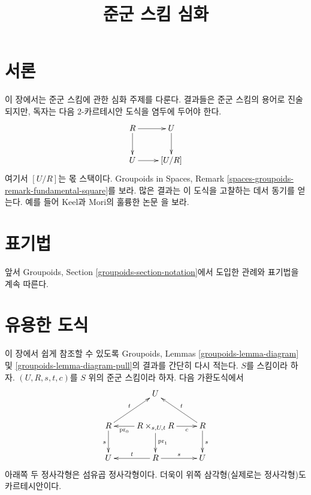 

%


\title{준군 스킴 심화}


\maketitle

\label{section-phantom}

\tableofcontents

\section{서론}
\label{section-introduction}

\noindent
이 장에서는 준군 스킴에 관한 심화 주제를 다룬다.
결과들은 준군 스킴의 용어로 진술되지만, 독자는 다음
$2$-카르테시안 도식을 염두에 두어야 한다.
\begin{equation}
\label{equation-quotient-stack}
\vcenter{
\xymatrix{
R \ar[r] \ar[d] & U \ar[d] \\
U \ar[r] & [U/R]
}
}
\end{equation}
여기서 $[U/R]$는 몫 스택이다. Groupoids in Spaces, Remark
\ref{spaces-groupoids-remark-fundamental-square}를 보라.
많은 결과는 이 도식을 고찰하는 데서 동기를 얻는다.
예를 들어 Keel과 Mori의 훌륭한 논문 \cite{K-M}을 보라.





\section{표기법}
\label{section-notation}

\noindent
앞서 Groupoids, Section \ref{groupoids-section-notation}에서 도입한
관례와 표기법을 계속 따른다.






\section{유용한 도식}
\label{section-diagrams}

\noindent
이 장에서 쉽게 참조할 수 있도록 Groupoids, Lemmas
\ref{groupoids-lemma-diagram} 및
\ref{groupoids-lemma-diagram-pull}의 결과를 간단히 다시 적는다.
$S$를 스킴이라 하자.
$(U, R, s, t, c)$를 $S$ 위의 준군 스킴이라 하자.
다음 가환도식에서
\begin{equation}
\label{equation-diagram}
\vcenter{
\xymatrix{
& U & \\
R \ar[d]_s \ar[ru]^t &
R \times_{s, U, t} R
\ar[l]^-{\text{pr}_0} \ar[d]^{\text{pr}_1} \ar[r]_-c &
R \ar[d]^s \ar[lu]_t \\
U & R \ar[l]_t \ar[r]^s & U
}
}
\end{equation}
아래쪽 두 정사각형은 섬유곱 정사각형이다.
더욱이 위쪽 삼각형(실제로는 정사각형)도 카르테시안이다.

